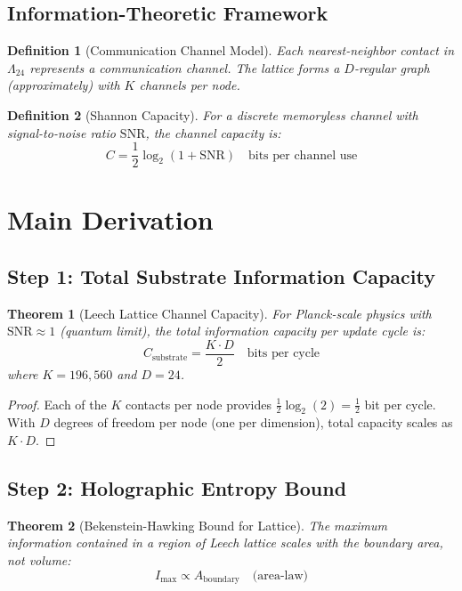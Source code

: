 \documentclass[11pt]{article}
\newtheorem{theorem}{Theorem}
\newtheorem{definition}{Definition}
\begin{document}
\subsection{Information-Theoretic Framework}

\begin{definition}[Communication Channel Model]
Each nearest-neighbor contact in $\Lambda_{24}$ represents a communication channel. The lattice forms a $D$-regular graph (approximately) with $K$ channels per node.
\end{definition}

\begin{definition}[Shannon Capacity]
For a discrete memoryless channel with signal-to-noise ratio $\text{SNR}$, the channel capacity is:
\[
C = \frac{1}{2} \log_2(1 + \text{SNR}) \quad \text{bits per channel use}
\]
\end{definition}

\section{Main Derivation}

\subsection{Step 1: Total Substrate Information Capacity}

\begin{theorem}[Leech Lattice Channel Capacity]
For Planck-scale physics with $\text{SNR} \approx 1$ (quantum limit), the total information capacity per update cycle is:
\[
C_{\text{substrate}} = \frac{K \cdot D}{2} \quad \text{bits per cycle}
\]
where $K = 196,\!560$ and $D = 24$.
\end{theorem}

\begin{proof}
Each of the $K$ contacts per node provides $\frac{1}{2}\log_2(2) = \frac{1}{2}$ bit per cycle. With $D$ degrees of freedom per node (one per dimension), total capacity scales as $K \cdot D$.
\end{proof}

\subsection{Step 2: Holographic Entropy Bound}

\begin{theorem}[Bekenstein-Hawking Bound for Lattice]
The maximum information contained in a region of Leech lattice scales with the boundary area, not volume:
\[
I_{\text{max}} \propto A_{\text{boundary}} \quad \text{(area-law)}
\]
\end{theorem}
\end{document}
